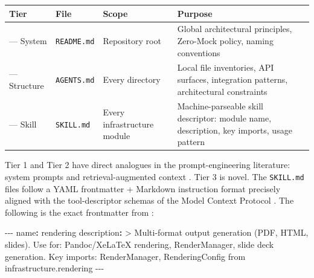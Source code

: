 \documentclass[
]{article}
\newenvironment{Shaded}{}{}
\newcommand{\AttributeTok}[1]{\textcolor[rgb]{0.49,0.56,0.16}{#1}}
\newcommand{\CharTok}[1]{\textcolor[rgb]{0.25,0.44,0.63}{#1}}
\newcommand{\FunctionTok}[1]{\textcolor[rgb]{0.02,0.16,0.49}{#1}}
\newcommand{\KeywordTok}[1]{\textcolor[rgb]{0.00,0.44,0.13}{\textbf{#1}}}
\newcommand{\NormalTok}[1]{#1}
\newcommand{\PreprocessorTok}[1]{\textcolor[rgb]{0.74,0.48,0.00}{#1}}
\newcounter{none} %
\begin{document}
{\def\LTcaptype{none} %
\begin{longtable}[]{@{}
  >{\raggedright\arraybackslash}p{}
  >{\raggedright\arraybackslash}p{}
  >{\raggedright\arraybackslash}p{}
  >{\raggedright\arraybackslash}p{}@{}}
\toprule\noalign{}
\begin{minipage}[b]{\linewidth}\raggedright
Tier
\end{minipage} & \begin{minipage}[b]{\linewidth}\raggedright
File
\end{minipage} & \begin{minipage}[b]{\linewidth}\raggedright
Scope
\end{minipage} & \begin{minipage}[b]{\linewidth}\raggedright
Purpose
\end{minipage} \\
\midrule\noalign{}
\endhead
\bottomrule\noalign{}
\endlastfoot
1 --- System & \texttt{README.md} & Repository root & Global
architectural principles, Zero-Mock policy, naming conventions \\
2 --- Structure & \texttt{AGENTS.md} & Every directory & Local file
inventories, API surfaces, integration patterns, architectural
constraints \\
3 --- Skill & \texttt{SKILL.md} & Every infrastructure module &
Machine-parseable skill descriptor: module name, description, key
imports, usage pattern \\
\end{longtable}
}

Tier 1 and Tier 2 have direct analogues in the prompt-engineering
literature: system prompts and retrieval-augmented context
\citep{lau2025aicoding}. Tier 3 is novel. The \texttt{SKILL.md} files
follow a YAML frontmatter + Markdown instruction format precisely
aligned with the tool-descriptor schemas of the Model Context Protocol
\citep{anthropic2024mcp}. The following is the exact frontmatter from
:

\begin{Shaded}
\begin{Highlighting}[]
\PreprocessorTok{{-}{-}{-}}
\FunctionTok{name}\KeywordTok{:}\AttributeTok{ rendering}
\FunctionTok{description}\KeywordTok{: }\CharTok{\textgreater{}}
\NormalTok{  Multi{-}format output generation (PDF, HTML, slides).}
\NormalTok{  Use for: Pandoc/XeLaTeX rendering, RenderManager, slide deck generation.}
\NormalTok{  Key imports: RenderManager, RenderingConfig from infrastructure.rendering}
\PreprocessorTok{{-}{-}{-}}
\end{Highlighting}
\end{Shaded}
\end{document}
